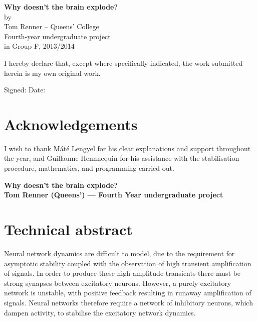 \documentclass[12pt, a4paper]{article}
\begin{document}
\thispagestyle{empty}

\vspace*{7cm}
\begin{center}
    \large{\bf{Why doesn't the brain explode?}}\\
    by\\
    Tom Renner -- Queens' College\\
    Fourth-year undergraduate project\\
    in Group F, 2013/2014
\end{center}

\vspace{3cm}
I hereby declare that, except where specifically indicated, the work submitted herein is my own original work.\\
\vspace{1cm}

Signed: \hspace{8cm} Date:


\pagebreak
\thispagestyle{empty}
\vspace*{5cm}
\section*{Acknowledgements}

I wish to thank M\'{a}t\'{e} Lengyel for his clear explanations and support throughout the year, and Guillaume Hennnequin for his assistance with the stabilisation procedure, mathematics, and programming carried out.



\pagebreak
{}
\begin{center}
\large
    \bf{Why doesn't the brain explode?} \\
    Tom Renner (Queens') --- Fourth Year undergraduate project
\end{center}

\section*{Technical abstract}

Neural network dynamics are difficult to model, due to the requirement for asymptotic stability coupled with the observation of high transient amplification of signals.  In order to produce these high amplitude transients there must be strong synapses between excitatory neurons.  However, a purely excitatory network is unstable, with positive feedback resulting in runaway amplification of signals.  Neural networks therefore require a network of inhibitory neurons, which dampen activity, to stabilise the excitatory network dynamics. 
\end{document}
